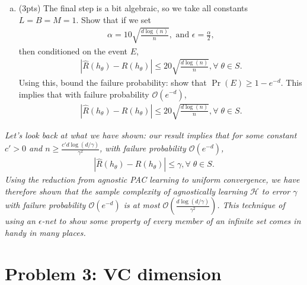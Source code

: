 \documentclass[11pt]{article}
\DeclareMathOperator{\prob}{Pr}
\newcommand{\calH}{{\mathcal{H}}}
\newcommand{\blue}[1]{{\color{blue}#1}}
\newcommand{\order}{\ensuremath{\mathcal{O}}}
\begin{document}
\begin{enumerate}[(a)]
   \item (\blue{3pts}) The final step is a bit algebraic, so we take all constants $L=B=M=1$. Show that if we set 
    \begin{align*}
        \alpha=10\sqrt{\frac{d\log(n)}{n}}, \text{ and } \epsilon=\frac{\alpha}{2},
    \end{align*}
    then conditioned on the event $E$, 
    \begin{align*}
        |\hat{R}(h_{\theta})-R(h_{\theta})| \le 20\sqrt{\frac{d\log(n)}{n}}, \forall \; \theta \in S.
    \end{align*}
    Using this, bound the failure probability: show that $\prob(E)\ge {1-e^{-d}}$. This implies that with failure probability $\order(e^{-d})$,
   \begin{align*}
        |\hat{R}(h_{\theta})-R(h_{\theta})| \le 20\sqrt{\frac{d\log(n)}{n}}, \forall \; \theta \in S.
    \end{align*}

\end{enumerate}

\emph{Let's look back at what we have shown: our result implies that for some constant $c'>0$ and $n\ge \frac{c'd\log(d/\gamma)}{\gamma^2}$, with failure probability $\order(e^{-d})$,
    \begin{align*}
        |\hat{R}(h_{\theta})-R(h_{\theta})| \le \gamma, \forall \; \theta \in S.
    \end{align*}
    Using the reduction from agnostic PAC learning to uniform convergence, we have therefore shown that the sample complexity of agnostically learning $\calH$ to error $\gamma$ with failure probability $\order(e^{-d})$ is at most $\order\left(\frac{d\log(d/\gamma)}{\gamma^2}\right)$. This technique of using an $\epsilon$-net to show some property of every member of an infinite set comes in handy in many places.}

\section*{Problem 3: VC dimension}
\end{document}
